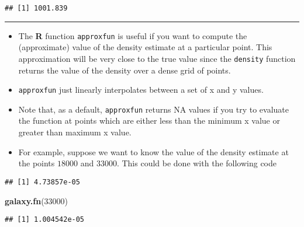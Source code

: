 \documentclass[]{book}
\newenvironment{Shaded}{\begin{snugshade}}{\end{snugshade}}
\newcommand{\DecValTok}[1]{\textcolor[rgb]{0.00,0.00,0.81}{#1}}
\newcommand{\KeywordTok}[1]{\textcolor[rgb]{0.13,0.29,0.53}{\textbf{#1}}}
\newcommand{\NormalTok}[1]{#1}
\newcommand{\OperatorTok}[1]{\textcolor[rgb]{0.81,0.36,0.00}{\textbf{#1}}}
\newcommand{\StringTok}[1]{\textcolor[rgb]{0.31,0.60,0.02}{#1}}
\begin{document}
\begin{verbatim}
## [1] 1001.839
\end{verbatim}

\begin{center}\rule{0.5\linewidth}{\linethickness}\end{center}

\begin{itemize}
\item
  The \textbf{R} function \texttt{approxfun} is useful if you want to compute the (approximate) value of the density
  estimate at a particular point. This approximation will be very close to the true value since
  the \texttt{density} function returns the value of the density over a dense grid of points.
\item
  \texttt{approxfun} just linearly interpolates between a set of x and y values.
\item
  Note that, as a default, \texttt{approxfun} returns NA values if you try to evaluate the function
  at points which are either less than the minimum x value or greater than maximum x value.
\item
  For example, suppose we want to know the value of the density estimate at the points \(18000\)
  and \(33000\). This could be done with the following code
\end{itemize}

\begin{Shaded}
\end{Shaded}

\begin{verbatim}
## [1] 4.73857e-05
\end{verbatim}

\begin{Shaded}
\begin{Highlighting}[]
\KeywordTok{galaxy.fn}\NormalTok{(}\DecValTok{33000}\NormalTok{)}
\end{Highlighting}
\end{Shaded}

\begin{verbatim}
## [1] 1.004542e-05
\end{verbatim}
\end{document}
